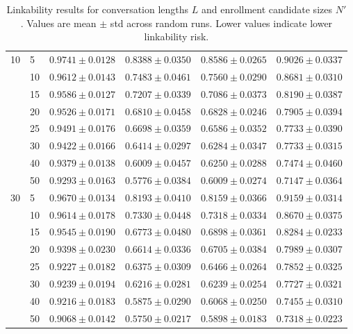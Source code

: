 \documentclass[12pt,leqno,a4paper]{article}
\begin{document}
\begin{table}[H]
\begin{tabular}{llcccc}
\hline
10 & 5  & $0.9741 \pm 0.0128$ & $0.8388 \pm 0.0350$ 
         & $0.8586 \pm 0.0265$ & $0.9026 \pm 0.0337$ \\
   & 10 & $0.9612 \pm 0.0143$ & $0.7483 \pm 0.0461$ 
         & $0.7560 \pm 0.0290$ & $0.8681 \pm 0.0310$ \\
   & 15 & $0.9586 \pm 0.0127$ & $0.7207 \pm 0.0339$ 
         & $0.7086 \pm 0.0373$ & $0.8190 \pm 0.0387$ \\
   & 20 & $0.9526 \pm 0.0171$ & $0.6810 \pm 0.0458$ 
         & $0.6828 \pm 0.0246$ & $0.7905 \pm 0.0394$ \\
   & 25 & $0.9491 \pm 0.0176$ & $0.6698 \pm 0.0359$ 
         & $0.6586 \pm 0.0352$ & $0.7733 \pm 0.0390$ \\
   & 30 & $0.9422 \pm 0.0166$ & $0.6414 \pm 0.0297$ 
         & $0.6284 \pm 0.0347$ & $0.7733 \pm 0.0315$ \\
   & 40 & $0.9379 \pm 0.0138$ & $0.6009 \pm 0.0457$ 
         & $0.6250 \pm 0.0288$ & $0.7474 \pm 0.0460$ \\
   & 50 & $0.9293 \pm 0.0163$ & $0.5776 \pm 0.0384$ 
         & $0.6009 \pm 0.0274$ & $0.7147 \pm 0.0364$ \\
\hline
30 & 5  & $0.9670 \pm 0.0134$ & $0.8193 \pm 0.0410$ 
         & $0.8159 \pm 0.0366$ & $0.9159 \pm 0.0314$ \\
   & 10 & $0.9614 \pm 0.0178$ & $0.7330 \pm 0.0448$ 
         & $0.7318 \pm 0.0334$ & $0.8670 \pm 0.0375$ \\
   & 15 & $0.9545 \pm 0.0190$ & $0.6773 \pm 0.0480$ 
         & $0.6898 \pm 0.0361$ & $0.8284 \pm 0.0233$ \\
   & 20 & $0.9398 \pm 0.0230$ & $0.6614 \pm 0.0336$ 
         & $0.6705 \pm 0.0384$ & $0.7989 \pm 0.0307$ \\
   & 25 & $0.9227 \pm 0.0182$ & $0.6375 \pm 0.0309$ 
         & $0.6466 \pm 0.0264$ & $0.7852 \pm 0.0325$ \\
   & 30 & $0.9239 \pm 0.0194$ & $0.6216 \pm 0.0281$ 
         & $0.6239 \pm 0.0254$ & $0.7727 \pm 0.0321$ \\
   & 40 & $0.9216 \pm 0.0183$ & $0.5875 \pm 0.0290$ 
         & $0.6068 \pm 0.0250$ & $0.7455 \pm 0.0310$ \\
   & 50 & $0.9068 \pm 0.0142$ & $0.5750 \pm 0.0217$ 
         & $0.5898 \pm 0.0183$ & $0.7318 \pm 0.0223$ \\
\hline
\end{tabular}
\caption{Linkability results for conversation lengths $L$ and 
enrollment candidate sizes $N'$. Values are mean $\pm$ std across 
random runs. Lower values indicate lower linkability risk.}
\label{tab:linkability_all_results}
\end{table}
\end{document}

